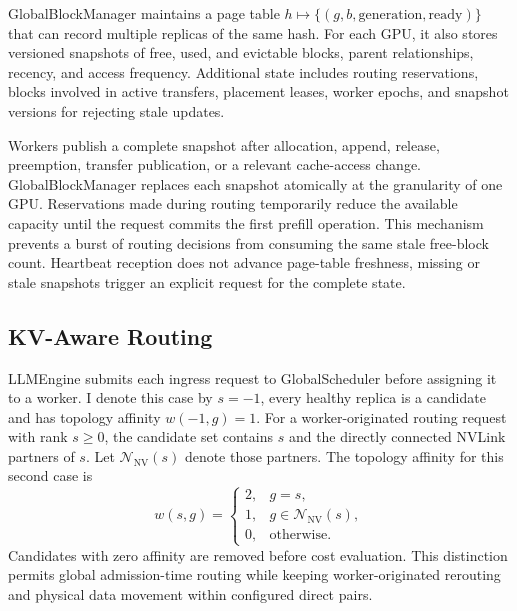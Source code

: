 \documentclass{article}
\begin{document}
GlobalBlockManager maintains a page table $h \mapsto \{(g,b,\mathrm{generation},\mathrm{ready})\}$ that can record multiple replicas of the same hash. For each GPU, it also stores versioned snapshots of free, used, and evictable blocks, parent relationships, recency, and access frequency. Additional state includes routing reservations, blocks involved in active transfers, placement leases, worker epochs, and snapshot versions for rejecting stale updates.

Workers publish a complete snapshot after allocation, append, release, preemption, transfer publication, or a relevant cache-access change. GlobalBlockManager replaces each snapshot atomically at the granularity of one GPU. Reservations made during routing temporarily reduce the available capacity until the request commits the first prefill operation. This mechanism prevents a burst of routing decisions from consuming the same stale free-block count. Heartbeat reception does not advance page-table freshness, missing or stale snapshots trigger an explicit request for the complete state.

\subsection{KV-Aware Routing}
\label{sec:routing}

LLMEngine submits each ingress request to GlobalScheduler before assigning it to a worker. I denote this case by $s=-1$, every healthy replica is a candidate and has topology affinity $w(-1,g)=1$. For a worker-originated routing request with rank $s\geq0$, the candidate set contains $s$ and the directly connected NVLink partners of $s$. Let $\mathcal{N}_{\mathrm{NV}}(s)$ denote those partners. The topology affinity for this second case is
\begin{equation}
 w(s,g)=
 \begin{cases}
 2, & g=s,\\
 1, & g\in\mathcal{N}_{\mathrm{NV}}(s),\\
 0, & \text{otherwise}.
 \end{cases}
\end{equation}
Candidates with zero affinity are removed before cost evaluation. This distinction permits global admission-time routing while keeping worker-originated rerouting and physical data movement within configured direct pairs.
\end{document}
